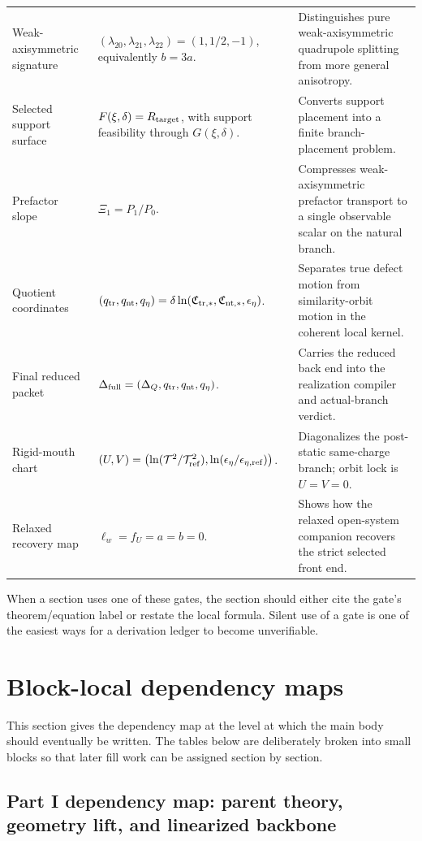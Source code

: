 \begin{longtable}{L{0.16\textwidth}L{0.38\textwidth}L{0.30\textwidth}}
\addlinespace
Weak-axisymmetric signature & \((\lambda_{20},\lambda_{21},\lambda_{22})=(1,1/2,-1)\), equivalently \(b=3a\). & Distinguishes pure weak-axisymmetric quadrupole splitting from more general anisotropy. \\
\addlinespace
Selected support surface & \(F(\xi,\delta)=R_{\rm target}\), with support feasibility through \(G(\xi,\delta)\). & Converts support placement into a finite branch-placement problem. \\
\addlinespace
Prefactor slope & \(\Xi_1=P_1/P_0\). & Compresses weak-axisymmetric prefactor transport to a single observable scalar on the natural branch. \\
\addlinespace
Quotient coordinates & \((q_{\rm tr},q_{\rm nt},q_\eta)=\delta\ln(\mathfrak C_{{\rm tr},*},\mathfrak C_{{\rm nt},*},\epsilon_\eta)\). & Separates true defect motion from similarity-orbit motion in the coherent local kernel. \\
\addlinespace
Final reduced packet & \(\Delta_{\rm full}=(\Delta_Q,q_{\rm tr},q_{\rm nt},q_\eta)\). & Carries the reduced back end into the realization compiler and actual-branch verdict. \\
\addlinespace
Rigid-mouth chart & \((U,V)=\bigl(\ln(\mathcal T^2/\mathcal T_{\rm ref}^2),\ln(\epsilon_\eta/\epsilon_{\eta,{\rm ref}})\bigr)\). & Diagonalizes the post-static same-charge branch; orbit lock is \(U=V=0\). \\
\addlinespace
Relaxed recovery map & \(\ell_w=f_U=a=b=0\). & Shows how the relaxed open-system companion recovers the strict selected front end. \\
\bottomrule
\end{longtable}

When a section uses one of these gates, the section should either cite the gate's theorem/equation label or restate the local formula.  Silent use of a gate is one of the easiest ways for a derivation ledger to become unverifiable.

\section{Block-local dependency maps}
\label{sec:block-local-dependency-maps}

This section gives the dependency map at the level at which the main body should eventually be written.  The tables below are deliberately broken into small blocks so that later fill work can be assigned section by section.

\subsection{Part I dependency map: parent theory, geometry lift, and linearized backbone}
\label{subsec:dep-part-i}

